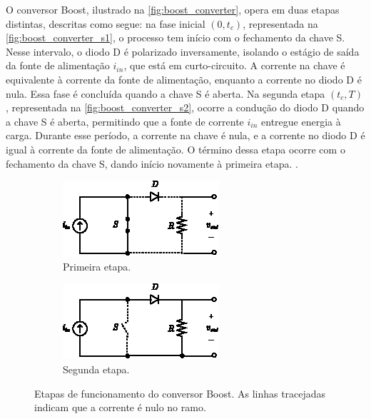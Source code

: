 O conversor Boost, ilustrado na \autoref{fig:boost_converter}, opera em duas etapas distintas, descritas como segue: na fase inicial $(0, t_c)$, representada na \autoref{fig:boost_converter_s1}, o processo tem início com o fechamento da chave S. Nesse intervalo, o diodo D é polarizado inversamente, isolando o estágio de saída da fonte de alimentação $i_{in}$, que está em curto-circuito. A corrente na chave é equivalente à corrente da fonte de alimentação, enquanto a corrente no diodo D é nula. Essa fase é concluída quando a chave S é aberta. Na segunda etapa $(t_c, T)$, representada na \autoref{fig:boost_converter_s2}, ocorre a condução do diodo D quando a chave S é aberta, permitindo que a fonte de corrente $i_{in}$ entregue energia à carga. Durante esse período, a corrente na chave é nula, e a corrente no diodo D é igual à corrente da fonte de alimentação. O término dessa etapa ocorre com o fechamento da chave S, dando início novamente à primeira etapa. \cite{martins2008}.

\begin{figure}[h]
  \centering
  \captionsetup{justification=centering}
  \begin{subfigure}[b]{0.37\textwidth}
    \centering
    \includegraphics[width=\textwidth]{figuras/boost_converter_s1.eps}
    \caption{Primeira etapa.}
    \label{fig:boost_converter_s1}
  \end{subfigure}%
  \hfil
  \begin{subfigure}[b]{0.37\textwidth}
    \centering
    \includegraphics[width=\textwidth]{figuras/boost_converter_s2.eps}
    \caption{Segunda etapa.}
    \label{fig:boost_converter_s2}
  \end{subfigure}
  \caption{Etapas de funcionamento do conversor Boost. As linhas tracejadas indicam que a corrente é nulo no ramo.}
\end{figure}

